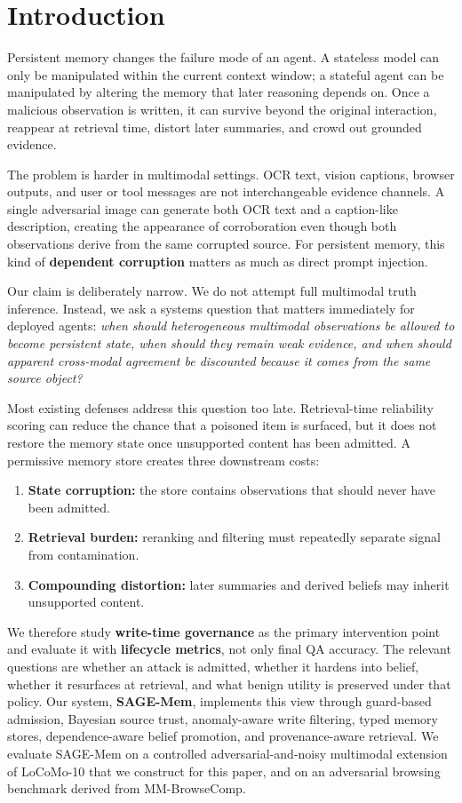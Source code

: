 \documentclass{article}
\begin{document}
\section{Introduction}

Persistent memory changes the failure mode of an agent. A stateless model can only be manipulated within the current context window; a stateful agent can be manipulated by altering the memory that later reasoning depends on. Once a malicious observation is written, it can survive beyond the original interaction, reappear at retrieval time, distort later summaries, and crowd out grounded evidence.

The problem is harder in multimodal settings. OCR text, vision captions, browser outputs, and user or tool messages are not interchangeable evidence channels. A single adversarial image can generate both OCR text and a caption-like description, creating the appearance of corroboration even though both observations derive from the same corrupted source. For persistent memory, this kind of \textbf{dependent corruption} matters as much as direct prompt injection.

Our claim is deliberately narrow. We do not attempt full multimodal truth inference. Instead, we ask a systems question that matters immediately for deployed agents: \emph{when should heterogeneous multimodal observations be allowed to become persistent state, when should they remain weak evidence, and when should apparent cross-modal agreement be discounted because it comes from the same source object?}

Most existing defenses address this question too late. Retrieval-time reliability scoring can reduce the chance that a poisoned item is surfaced, but it does not restore the memory state once unsupported content has been admitted. A permissive memory store creates three downstream costs:

\begin{enumerate}
\item \textbf{State corruption:} the store contains observations that should never have been admitted.
\item \textbf{Retrieval burden:} reranking and filtering must repeatedly separate signal from contamination.
\item \textbf{Compounding distortion:} later summaries and derived beliefs may inherit unsupported content.
\end{enumerate}

We therefore study \textbf{write-time governance} as the primary intervention point and evaluate it with \textbf{lifecycle metrics}, not only final QA accuracy. The relevant questions are whether an attack is admitted, whether it hardens into belief, whether it resurfaces at retrieval, and what benign utility is preserved under that policy. Our system, \textbf{SAGE-Mem}, implements this view through guard-based admission, Bayesian source trust, anomaly-aware write filtering, typed memory stores, dependence-aware belief promotion, and provenance-aware retrieval. We evaluate SAGE-Mem on a controlled adversarial-and-noisy multimodal extension of LoCoMo-10 that we construct for this paper, and on an adversarial browsing benchmark derived from MM-BrowseComp.
\end{document}
